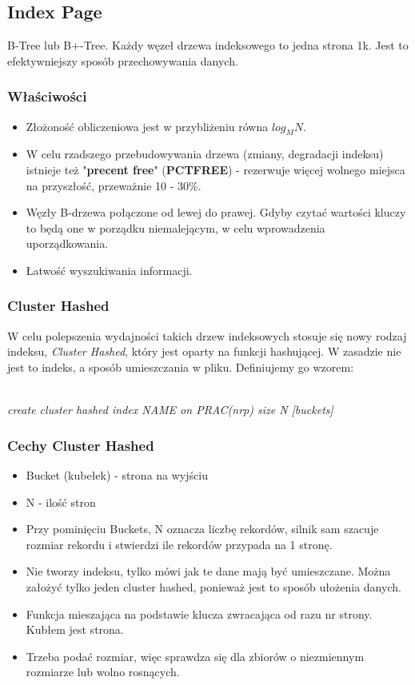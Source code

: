 \documentclass[a4paper,twoside]{article}
\begin{document}
  		\subsection*{Index Page}
  		B-Tree lub B+-Tree. Każdy węzeł drzewa indeksowego to jedna strona 1k. Jest to efektywniejszy sposób przechowywania danych.
  		\subsubsection*{Właściwości}
  		\begin{itemize}
  			\item Złożoność obliczeniowa jest w przybliżeniu równa \(log_M N\).
  			\item W celu rzadszego przebudowywania drzewa (zmiany, degradacji indeksu) istnieje też "\textbf{precent free}" (\textbf{PCTFREE}) - rezerwuje więcej wolnego miejsca na przyszłość, przeważnie 10 - 30\%.
  			\item Węzły B-drzewa połączone od lewej do prawej. Gdyby czytać wartości kluczy to będą one w porządku niemalejącym, w celu wprowadzenia uporządkowania.
  			\item Łatwość wyszukiwania informacji.
  		\end{itemize}
  		\subsubsection*{Cluster Hashed}
  		W celu polepszenia wydajności takich drzew indeksowych stosuje się nowy rodzaj indeksu, \emph{Cluster Hashed}, który jest oparty na funkcji hashującej. W zasadzie nie jest to indeks, a sposób umieszczania w pliku. Definiujemy go wzorem:\\\\
  		\centerline{\textit{create cluster hashed index NAME on PRAC(nrp) size N [buckets]}}
  		\subsubsection*{Cechy Cluster Hashed}
  		\begin{itemize}
  			\item Bucket (kubełek) - strona na wyjściu
  			\item N - ilość stron
  			\item Przy pominięciu Buckets, N oznacza liczbę rekordów, silnik sam szacuje rozmiar rekordu i stwierdzi ile rekordów przypada na 1 stronę.
  			\item Nie tworzy indeksu, tylko mówi jak te dane mają być umieszczane. Można założyć tylko jeden cluster hashed, ponieważ jest to sposób ułożenia danych.
  			\item Funkcja mieszająca na podstawie klucza zwracająca od razu nr strony. Kubłem jest strona.
  			\item Trzeba podać rozmiar, więc sprawdza się dla zbiorów o niezmiennym rozmiarze lub wolno rosnących.
  		\end{itemize}
\end{document}
